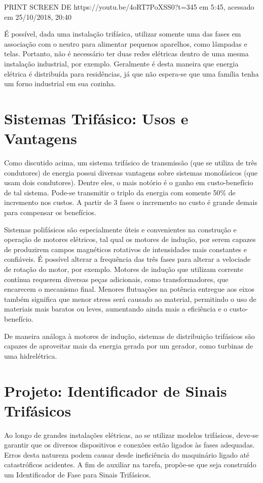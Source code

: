 \documentclass[12pt,a4paper,openany]{abntex2}
\begin{document}
PRINT SCREEN DE https://youtu.be/4oRT7PoXSS0?t=345  em 5:45, acessado em 25/10/2018, 20:40

É possível, dada uma instalação trifásica, utilizar somente uma das fases em associação com o neutro para alimentar pequenos aparelhos, como lâmpadas e telas. Portanto, não é necessário ter duas redes elétricas dentro de uma mesma instalação industrial, por exemplo. Geralmente é desta maneira que energia elétrica é distribuída para residências, já que não espera-se que uma família tenha um forno industrial em sua cozinha.

\section{Sistemas Trifásico: Usos e Vantagens}

Como discutido acima, um sistema trifásico de transmissão (que se utiliza de três condutores) de energia possui diversas vantagens sobre sistemas monofásicos (que usam dois condutores). Dentre eles, o mais notório é o ganho em custo-benefício de tal sistema. Pode-se transmitir o triplo da energia com somente 50\% de incremento nos custos. A partir de 3 fases o incremento no custo é grande demais para compensar os benefícios.

Sistemas polifásicos são especialmente úteis e convenientes na construção e operação de motores elétricos, tal qual os motores de indução, por serem capazes de produzirem campos magnéticos rotativos de intensidades mais constantes e confiáveis. É possível alterar a frequência das três fases para alterar a velociade de rotação do motor, por exemplo. Motores de indução que utilizam corrente contínua requerem diversas peças adicionais, como transformadores, que encarecem o mecanismo final. Menores flutuações na potência entregue aos eixos também significa que menor stress será causado ao material, permitindo o uso de materiais mais baratos ou leves, aumentando ainda mais a eficiência e o custo-benefício.

De maneira análoga à motores de indução, sistemas de distribuição trifásicos são capazes de aproveitar mais da energia gerada por um gerador, como turbinas de uma hidrelétrica.

\section{Projeto: Identificador de Sinais Trifásicos}

Ao longo de grandes instalações elétricas, ao se utilizar modelos trifásicos, deve-se garantir que os diversos dispositivos e conexões estão ligados às fases adequadas. Erros desta natureza podem causar desde ineficiência do maquinário ligado até catastróficos acidentes. A fim de auxiliar na tarefa, propõe-se que seja construído um Identificador de Fase para Sinais Trifásicos.
\end{document}
